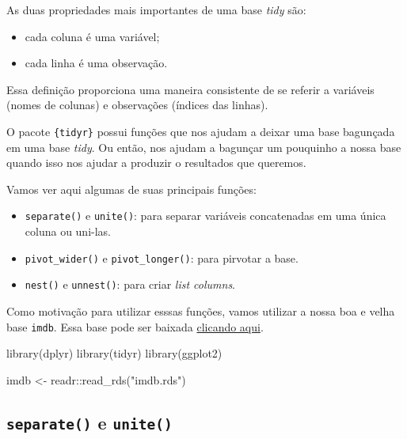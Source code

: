 \documentclass[
]{book}
\newenvironment{Shaded}{\begin{snugshade}}{\end{snugshade}}
\newcommand{\FunctionTok}[1]{\textcolor[rgb]{0.00,0.00,0.00}{#1}}
\newcommand{\NormalTok}[1]{#1}
\newcommand{\OtherTok}[1]{\textcolor[rgb]{0.56,0.35,0.01}{#1}}
\newcommand{\SpecialCharTok}[1]{\textcolor[rgb]{0.00,0.00,0.00}{#1}}
\newcommand{\StringTok}[1]{\textcolor[rgb]{0.31,0.60,0.02}{#1}}
\begin{document}
As duas propriedades mais importantes de uma base \emph{tidy} são:

\begin{itemize}
\item
  cada coluna é uma variável;
\item
  cada linha é uma observação.
\end{itemize}

Essa definição proporciona uma maneira consistente de se referir a variáveis (nomes de colunas) e observações (índices das linhas).

O pacote \texttt{\{tidyr\}} possui funções que nos ajudam a deixar uma base bagunçada em uma base \emph{tidy}. Ou então, nos ajudam a bagunçar um pouquinho a nossa base quando isso nos ajudar a produzir o resultados que queremos.

Vamos ver aqui algumas de suas principais funções:

\begin{itemize}
\item
  \texttt{separate()} e \texttt{unite()}: para separar variáveis concatenadas em uma única coluna ou uni-las.
\item
  \texttt{pivot\_wider()} e \texttt{pivot\_longer()}: para pirvotar a base.
\item
  \texttt{nest()} e \texttt{unnest()}: para criar \emph{list columns}.
\end{itemize}

Como motivação para utilizar esssas funções, vamos utilizar a nossa boa e velha base \texttt{imdb}. Essa base pode ser baixada \href{https://github.com/curso-r/livro-material/raw/master/assets/data/imdb.rds}{clicando aqui}.

\begin{Shaded}
\begin{Highlighting}[]
\FunctionTok{library}\NormalTok{(dplyr)}
\FunctionTok{library}\NormalTok{(tidyr)}
\FunctionTok{library}\NormalTok{(ggplot2)}

\NormalTok{imdb }\OtherTok{\textless{}{-}}\NormalTok{ readr}\SpecialCharTok{::}\FunctionTok{read\_rds}\NormalTok{(}\StringTok{"imdb.rds"}\NormalTok{)}
\end{Highlighting}
\end{Shaded}

\hypertarget{separate-e-unite}{%
\subsection{\texorpdfstring{\texttt{separate()} e \texttt{unite()}}{separate() e unite()}}\label{separate-e-unite}}
\end{document}
